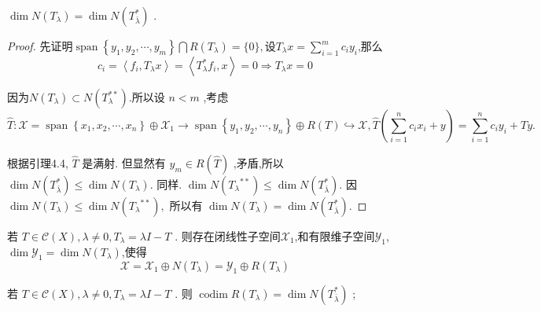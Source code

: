 \documentclass[lang=cn,newtx,10pt,scheme=chinese,thmcnt=chapter]{elegantbook}
\begin{document}
\begin{lemma}
    \( \dim N\left(T_\lambda\right)  = \dim N\left(  T_{\bar{\lambda}}^{ * }\right) \) .
\end{lemma}
\begin{proof}
   先证明$ \operatorname{span}\left\{  {{y}_{1},{y}_{2},\cdots ,{y}_{m}}\right\}  \bigcap  R\left( T_\lambda\right)=\{0\},设$$T_\lambda x=\sum\limits_{i=1}^mc_iy_i$,那么
\[c_i=\left\langle f_i,T_\lambda x\right\rangle=\left\langle T_\lambda^* f_i,x\right\rangle=0\Rightarrow T_\lambda x=0\]
   
   因为$N(T_\lambda)\subset N(T_\lambda^{**})$.所以设 \( n < m \) ,考虑
\[ \widehat{T} : \mathcal{X} = \operatorname{span}\left\{  {{x}_{1},{x}_{2},\cdots ,{x}_{n}}\right\}   \oplus  {\mathcal{X}}_{1} \rightarrow  \operatorname{span}\left\{  {{y}_{1},{y}_{2},\cdots ,{y}_{n}}\right\}   \oplus  R\left( T\right)  \hookrightarrow  \mathcal{X},  \widehat{T}\left( {\mathop{\sum }\limits_{{i = 1}}^{n}{c}_{i}{x}_{i} + y}\right)  = \mathop{\sum }\limits_{{i = 1}}^{n}{c}_{i}{y}_{i} + {Ty}.\]

根据引理4.4, \( \widehat{T} \) 是满射. 但显然有 \( {y}_{m} \in  R\left( \widehat{T}\right) \) ,矛盾,所以\( \dim N\left( T_{\bar{\lambda}}^{ * }\right)  \leq  \dim N\left( T_\lambda\right) . \)
同样.
\( \dim N\left( {T_\lambda}^{* * }\right)  \leq  \dim N\left( T_{\bar{\lambda}}^{ * }\right) . \)
因
\( \dim N\left( T_\lambda\right)  \leq  \dim N\left( {T_\lambda}^{* * }\right) , \)
所以有
\( \dim N\left( T_\lambda\right)  = \dim N\left( T_{\bar{\lambda}}^{ * }\right) . \)
\end{proof}
\begin{corollary}
          若 \(T \in  \mathcal{C}\left( X\right) ,\lambda  \neq  0,{T}_{\lambda } = {\lambda I} - T\) . 则存在闭线性子空间$\mathcal{X}_1$,和有限维子空间$\mathcal{Y}_1$,$\dim \mathcal{Y}_1=\dim N(T_\lambda)$,使得\[
\mathcal{X}=\mathcal{X}_1\oplus N(T_\lambda) =\mathcal{Y}_1\oplus R(T_\lambda)
      \]
\end{corollary}
\begin{corollary}
        若 \(T \in  \mathcal{C}\left( X\right) ,\lambda  \neq  0,{T}_{\lambda } = {\lambda I} - T\) . 则 \(\operatorname{codim}R\left( {T}_{\lambda }\right)  = \dim N\left( {T}_{\bar{\lambda }}^{ * }\right)\) ;
\end{corollary}
\end{document}
